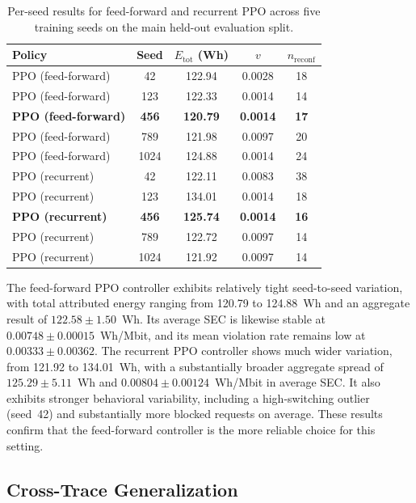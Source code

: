 \documentclass[a4paper,fleqn]{cas-sc}
\begin{document}
\begin{table}[width=.9\linewidth,cols=5,pos=h]
\centering
\caption{Per-seed results for feed-forward and recurrent PPO across five training seeds on the main held-out evaluation split.}
\label{tab:seed_robustness}
\begin{tabular}{l c c c c}
\hline
Policy & Seed & $E_{\mathrm{tot}}$ (Wh) & $v$ & $n_{\mathrm{reconf}}$ \\
\hline
PPO (feed-forward) & 42   & 122.94 & 0.0028 & 18 \\
PPO (feed-forward) & 123  & 122.33 & 0.0014 & 14 \\
\textbf{PPO (feed-forward)} & \textbf{456}  & \textbf{120.79} & \textbf{0.0014} & \textbf{17} \\
PPO (feed-forward) & 789  & 121.98 & 0.0097 & 20 \\
PPO (feed-forward) & 1024 & 124.88 & 0.0014 & 24 \\
\hline
PPO (recurrent)    & 42   & 122.11 & 0.0083 & 38 \\
PPO (recurrent)    & 123  & 134.01 & 0.0014 & 18 \\
\textbf{PPO (recurrent)} & \textbf{456}  & \textbf{125.74} & \textbf{0.0014} & \textbf{16} \\
PPO (recurrent)    & 789  & 122.72 & 0.0097 & 14 \\
PPO (recurrent)    & 1024 & 121.92 & 0.0097 & 14 \\
\hline
\end{tabular}
\end{table}

The feed-forward PPO controller exhibits relatively tight seed-to-seed variation, with total attributed energy ranging from 120.79 to 124.88~Wh and an aggregate result of $122.58 \pm 1.50$~Wh. Its average SEC is likewise stable at $0.00748 \pm 0.00015$~Wh/Mbit, and its mean violation rate remains low at $0.00333 \pm 0.00362$. The recurrent PPO controller shows much wider variation, from 121.92 to 134.01~Wh, with a substantially broader aggregate spread of $125.29 \pm 5.11$~Wh and $0.00804 \pm 0.00124$~Wh/Mbit in average SEC. It also exhibits stronger behavioral variability, including a high-switching outlier (seed~42) and substantially more blocked requests on average. These results confirm that the feed-forward controller is the more reliable choice for this setting.

\subsection{Cross-Trace Generalization}
\label{subsec:generalization}
\end{document}
